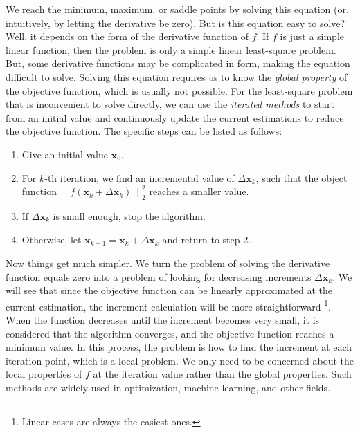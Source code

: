 We reach the minimum, maximum, or saddle points by solving this equation (or, intuitively, by letting the derivative be zero). But is this equation easy to solve? Well, it depends on the form of the derivative function of $f$. If $f$ is just a simple linear function, then the problem is only a simple linear least-square problem. But, some derivative functions may be complicated in form, making the equation difficult to solve. Solving this equation requires us to know the \textit{global property} of the objective function, which is usually not possible. For the least-square problem that is inconvenient to solve directly, we can use the \textit{iterated methods} to start from an initial value and continuously update the current estimations to reduce the objective function. The specific steps can be listed as follows:
\begin{mdframed}  
    \begin{enumerate}
        \item Give an initial value $\mathbf{x}_0$.
        \item For $k$-th iteration, we find an incremental value of $\Delta \mathbf{x}_k$, such that the object function $\left\| {f\left( \mathbf{x}_k + \Delta \mathbf{x}_k \right)} \right \|^2_2$ reaches a smaller value.
        \item If $\Delta \mathbf{x}_k$ is small enough, stop the algorithm.
        \item Otherwise, let $\mathbf{x}_{k+1} = \mathbf{x}_k+\Delta \mathbf{x}_k$ and return to step 2.
    \end{enumerate}
\end{mdframed}

Now things get much simpler. We turn the problem of solving the derivative function equals zero into a problem of looking for decreasing increments $\Delta \mathbf{x}_k$. We will see that since the objective function can be linearly approximated at the current estimation, the increment calculation will be more straightforward \footnote{Linear cases are always the easiest ones.}. When the function decreases until the increment becomes very small, it is considered that the algorithm converges, and the objective function reaches a minimum value. In this process, the problem is how to find the increment at each iteration point, which is a local problem. We only need to be concerned about the local properties of $f$ at the iteration value rather than the global properties. Such methods are widely used in optimization, machine learning, and other fields.

